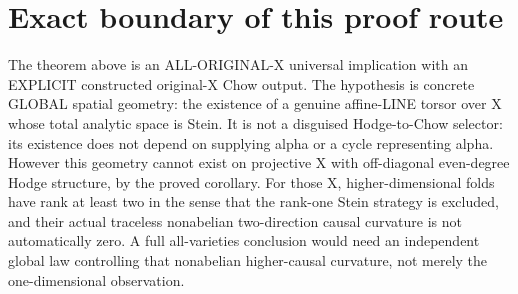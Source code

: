 \documentclass[11pt]{article}
\begin{document}
\section{Exact boundary of this proof route}
The theorem above is an ALL-ORIGINAL-X universal implication
with an EXPLICIT constructed original-X Chow output.
The hypothesis is concrete GLOBAL spatial geometry:
the existence of a genuine affine-LINE torsor over X
whose total analytic space is Stein.
It is not a disguised Hodge-to-Chow selector:
its existence does not depend on supplying alpha
or a cycle representing alpha.
However this geometry cannot exist on projective X with
off-diagonal even-degree Hodge structure, by the proved
corollary. For those X, higher-dimensional folds have
rank at least two in the sense that the rank-one
Stein strategy is excluded, and their actual
traceless nonabelian two-direction causal curvature
is not automatically zero.
A full all-varieties conclusion would need an independent
global law controlling that nonabelian higher-causal
curvature, not merely the one-dimensional observation.
\end{document}
